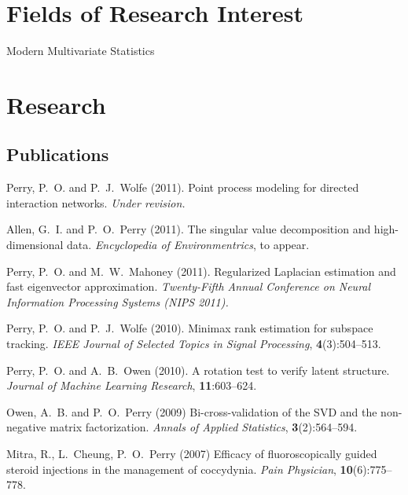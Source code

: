 \documentclass[10pt,letterpaper]{article}
\renewenvironment{itemize}{
  \begin{list}{}{
    \setlength{\leftmargin}{1.5em}
    \setlength{\itemsep}{0.25em}
    \setlength{\parskip}{0pt}
    \setlength{\parsep}{0.25em}
  }
}{
  \end{list}
}
\begin{document}
\section*{Fields of Research Interest}

\begin{itemize}
\item Modern Multivariate Statistics
\end{itemize}


\section*{Research}

\subsection*{Publications}

\begin{itemize}
\item Perry, P.~O. and P.~J.~Wolfe (2011).
Point process modeling for directed interaction networks.
\textit{Under revision.}

\item Allen, G.~I. and P.~O.~Perry (2011).
The singular value decomposition and high-dimensional data.
\textit{Encyclopedia of Environmentrics}, to appear.

\item Perry, P.~O. and M.~W.~Mahoney (2011).
Regularized Laplacian estimation and fast eigenvector approximation.
\textit{Twenty-Fifth Annual Conference on Neural Information Processing Systems (NIPS 2011).} 

\item Perry, P.~O. and P.~J.~Wolfe (2010).
Minimax rank estimation for subspace tracking.
\textit{IEEE Journal of Selected Topics in Signal Processing},
\textbf{4}(3):504--513.

\item Perry, P.~O. and A.~B.~Owen (2010).
A rotation test to verify latent structure.
\textit{Journal of Machine Learning Research},
\textbf{11}:603--624.

\item Owen, A.~B. and P.~O.~Perry (2009)
Bi-cross-validation of the SVD and the non-negative matrix factorization.
\textit{Annals of Applied Statistics},
\textbf{3}(2):564--594.

\item Mitra, R., L.~Cheung, P.~O.~Perry (2007)
Efficacy of fluoroscopically guided steroid injections in the management of coccydynia.
\textit{Pain Physician},
\textbf{10}(6):775--778.
\end{itemize}
\end{document}
